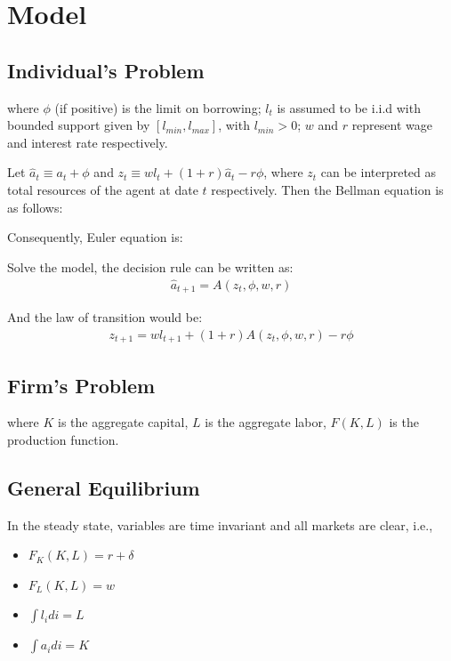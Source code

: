 \documentclass[]{article}
\providecommand{\EqDir}{Equations}
\begin{document}
\section{Model}
\subsection{Individual's Problem}


where $\phi$ (if positive) is the limit on borrowing; $l_t$ is assumed to be i.i.d with bounded support given by $[l_{min},l_{max}]$, with $l_{min}>0$; $w$ and $r$ represent wage and interest rate respectively.

Let $\hat{a}_t \equiv a_t+\phi$ and $z_t \equiv wl_t+(1+r)\hat{a}_t-r\phi$, where $z_t$ can be interpreted as total resources of the agent at date $t$ respectively. 
Then the Bellman equation is as follows:


Consequently, Euler equation is: 


Solve the model, the decision rule can be written as: 
\begin{align}
	\hat{a}_{t+1}=A(z_t,\phi,w,r)
\end{align}

And the law of transition would be:
\begin{align}
	z_{t+1}=wl_{t+1}+(1+r)A(z_t,\phi,w,r)-r\phi
\end{align}

\subsection{Firm's Problem}

where $K$ is the aggregate capital, $L$ is the aggregate labor, $F(K,L)$ is the production function.

\subsection{General Equilibrium}
In the steady state, variables are time invariant and all markets are clear, i.e.,
\begin{itemize}
	\item $F_K(K,L) = r+\delta$ 
	\item $F_L(K,L) = w$
	\item $\int l_i di = L$
	\item $\int a_i di = K$	
\end{itemize}
\end{document}
